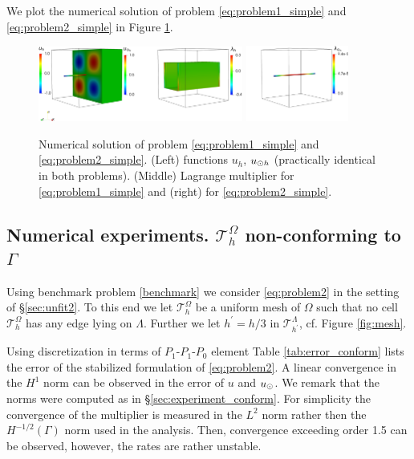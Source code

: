 \documentclass[r]{siamart171218}
\begin{document}
We plot the numerical solution of problem \eqref{eq:problem1_simple} and \eqref{eq:problem2_simple} in
Figure \ref{fig:sol_benchm1}.

\begin{figure}
\centering
\includegraphics[width = 0.6\textwidth]{./graphics/mfs_LM2d}
\includegraphics[width = 0.3\textwidth]{./graphics/mfs_LM1d_crop}
\caption{Numerical solution of problem \eqref{eq:problem1_simple} and
  \eqref{eq:problem2_simple}. (Left) functions $u_h$, $u_{\odot h}$ (practically identical
  in both problems). (Middle) Lagrange multiplier for \eqref{eq:problem1_simple}
  and (right) for \eqref{eq:problem2_simple}.}
\label{fig:sol_benchm1}
\end{figure}




\subsection{Numerical experiments. $\mathcal{T}^{\Omega}_h$ non-conforming to $\Gamma$}\label{sec:experiment_nonconform}
Using benchmark problem \eqref{benchmark} we consider \eqref{eq:problem2} in the
setting of \S \ref{sec:unfit2}. To this end we let $\mathcal{T}^{\Omega}_h$ be a uniform
mesh of $\Omega$ such that no cell $\mathcal{T}^{\Omega}_h$ has any edge
lying on $\Lambda$. Further we let $h^{\prime}=h/3$ in $\mathcal{T}^{\Lambda}_{h^{\prime}}$,
cf. Figure \ref{fig:mesh}.

Using discretization in terms of $P_1$-$P_1$-$P_0$ element Table \ref{tab:error_conform}
lists the error of the stabilized formulation of \eqref{eq:problem2}. A linear
convergence in the $H^1$ norm can be observed in the error of $u$ and $u_{\odot}$. We
remark that the norms were computed as in \S\ref{sec:experiment_conform}. For simplicity
the convergence of the multiplier is measured in the $L^2$ norm rather then the $H^{-1/2}(\Gamma)$
norm used in the analysis. Then, convergence exceeding order 1.5 can be observed, however,
the rates are rather unstable.
\end{document}
